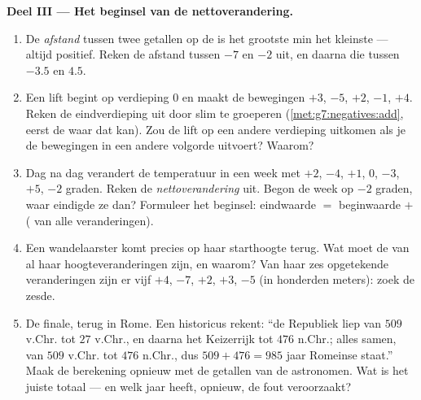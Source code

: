 \begin{problem}
\medskip
\noindent\textbf{Deel III --- Het beginsel van de nettoverandering.}
\begin{enumerate}[resume]
  \item De \emph{afstand} tussen twee getallen op de  is het grootste min het
        kleinste --- altijd positief. Reken de afstand tussen $-7$ en $-2$ uit,
        en daarna die tussen $-3.5$ en $4.5$.
  \item Een lift begint op verdieping $0$ en maakt de bewegingen $+3$, $-5$,
        $+2$, $-1$, $+4$. Reken de eindverdieping uit door slim te groeperen
        (\cref{met:g7:negatives:add}, eerst de  waar dat kan). Zou
        de lift op een andere verdieping uitkomen als je de bewegingen in een
        andere volgorde uitvoert? Waarom?
  \item Dag na dag verandert de temperatuur in een week met $+2$, $-4$, $+1$,
        $0$, $-3$, $+5$, $-2$ graden. Reken de \emph{nettoverandering} uit.
        Begon de week op $-2$ graden, waar eindigde ze dan? Formuleer het
        beginsel: eindwaarde $=$ beginwaarde $+$ ( van alle veranderingen).
  \item Een wandelaarster komt precies op haar starthoogte terug. Wat moet de 
        van al haar hoogteveranderingen zijn, en waarom? Van haar zes opgetekende
        veranderingen zijn er vijf $+4$, $-7$, $+2$, $+3$, $-5$ (in honderden
        meters): zoek de zesde.
  \item De finale, terug in Rome. Een historicus rekent: ``de Republiek liep van
        $509$ v.Chr. tot $27$ v.Chr., en daarna het Keizerrijk tot $476$ n.Chr.;
        alles samen, van $509$ v.Chr. tot $476$ n.Chr., dus $509 + 476 = 985$
        jaar Romeinse staat.'' Maak de berekening opnieuw met de getallen van de
        astronomen. Wat is het juiste totaal --- en welk jaar heeft, opnieuw, de
        fout veroorzaakt?
\end{enumerate}
\end{problem}
